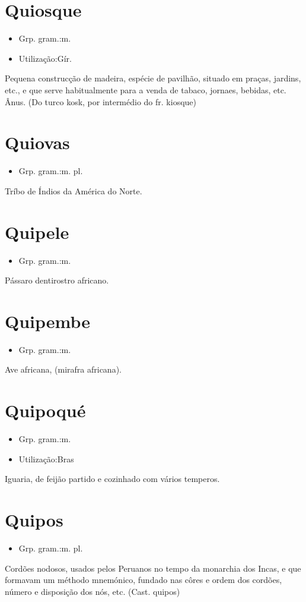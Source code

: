 \section{Quiosque}
\begin{itemize}
\item {Grp. gram.:m.}
\end{itemize}
\begin{itemize}
\item {Utilização:Gír.}
\end{itemize}
Pequena construcção de madeira, espécie de pavilhão, situado em praças, jardins, etc., e que serve habitualmente para a venda de tabaco, jornaes, bebidas, etc.
Ânus.
(Do turco \textunderscore kosk\textunderscore , por intermédio do fr. \textunderscore kiosque\textunderscore )
\section{Quiovas}
\begin{itemize}
\item {Grp. gram.:m. pl.}
\end{itemize}
Tríbo de Índios da América do Norte.
\section{Quipele}
\begin{itemize}
\item {Grp. gram.:m.}
\end{itemize}
Pássaro dentirostro africano.
\section{Quipembe}
\begin{itemize}
\item {Grp. gram.:m.}
\end{itemize}
Ave africana, (\textunderscore mirafra africana\textunderscore ).
\section{Quipoqué}
\begin{itemize}
\item {Grp. gram.:m.}
\end{itemize}
\begin{itemize}
\item {Utilização:Bras}
\end{itemize}
Iguaria, de feijão partido e cozinhado com vários temperos.
\section{Quipos}
\begin{itemize}
\item {Grp. gram.:m. pl.}
\end{itemize}
Cordões nodosos, usados pelos Peruanos no tempo da monarchia dos Incas, e que formavam um méthodo mnemónico, fundado nas côres e ordem dos cordões, número e disposição dos nós, etc.
(Cast. \textunderscore quipos\textunderscore )
